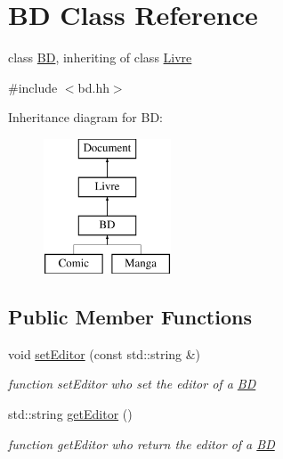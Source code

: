 \hypertarget{classBD}{
\section{BD Class Reference}
\label{classBD}
}


class \hyperlink{classBD}{BD}, inheriting of class \hyperlink{classLivre}{Livre}  




{\ttfamily \#include $<$bd.hh$>$}

Inheritance diagram for BD:\begin{figure}[H]
\begin{center}
\leavevmode
\includegraphics[height=4.000000cm]{classBD}
\end{center}
\end{figure}
\subsection*{Public Member Functions}
\begin{DoxyCompactItemize}
\item 
\hypertarget{classBD_ab2f657f8370b98b5d48789e89ff886f2}{
void \hyperlink{classBD_ab2f657f8370b98b5d48789e89ff886f2}{setEditor} (const std::string \&)}
\label{classBD_ab2f657f8370b98b5d48789e89ff886f2}

\begin{DoxyCompactList}\small\item\em function setEditor who set the editor of a \hyperlink{classBD}{BD} \item\end{DoxyCompactList}\item 
\hypertarget{classBD_a5d3c1d418d7907616b8febd605284741}{
std::string \hyperlink{classBD_a5d3c1d418d7907616b8febd605284741}{getEditor} ()}
\label{classBD_a5d3c1d418d7907616b8febd605284741}

\begin{DoxyCompactList}\small\item\em function getEditor who return the editor of a \hyperlink{classBD}{BD} \item\end{DoxyCompactList}\end{DoxyCompactItemize}
